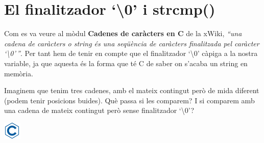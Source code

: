 \documentclass[]{book}
\newenvironment{Shaded}{\begin{snugshade}}{\end{snugshade}}
\newcommand{\DataTypeTok}[1]{\textcolor[rgb]{0.13,0.29,0.53}{#1}}
\newcommand{\DecValTok}[1]{\textcolor[rgb]{0.00,0.00,0.81}{#1}}
\newcommand{\SpecialCharTok}[1]{\textcolor[rgb]{0.00,0.00,0.00}{#1}}
\newcommand{\StringTok}[1]{\textcolor[rgb]{0.31,0.60,0.02}{#1}}
\newcommand{\ImportTok}[1]{#1}
\newcommand{\CommentTok}[1]{\textcolor[rgb]{0.56,0.35,0.01}{\textit{#1}}}
\newcommand{\PreprocessorTok}[1]{\textcolor[rgb]{0.56,0.35,0.01}{\textit{#1}}}
\newcommand{\NormalTok}[1]{#1}
\begin{document}
\section{\texorpdfstring{El finalitzador `\textbackslash{}0' i
strcmp()}{El finalitzador \textbackslash{}0 i strcmp()}}\label{el-finalitzador-0-i-strcmp}

Com es va veure al mòdul \textbf{Cadenes de caràcters en C} de la xWiki,
\emph{``una cadena de caràcters o string és una seqüència de caràcters
finalitzada pel caràcter `\textbackslash{}0'\,''}. Per tant hem de tenir
en compte que el finalitzador `\textbackslash{}0' càpiga a la nostra
variable, ja que aquesta és la forma que té C de saber on s'acaba un
string en memòria.

Imaginem que tenim tres cadenes, amb el mateix contingut però de mida
diferent (podem tenir posicions buides). Què passa si les comparem? I si
comparem amb una cadena de mateix contingut però sense finalitzador
`\textbackslash{}0'?

\includegraphics{./img/c.png}

\begin{Shaded}
\end{Shaded}
\end{document}
